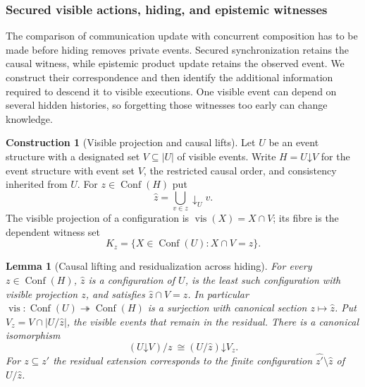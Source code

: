 \documentclass[11pt,a4paper]{article}
\numberwithin{equation}{section}
\newtheorem{lemma}[theorem]{Lemma}
\theoremstyle{definition}
\newtheorem{construction}[construction]{Construction}
\theoremstyle{remark}
\theoremstyle{plain}
\begin{document}
\subsubsection{Secured visible actions, hiding, and epistemic witnesses}
\label{sec:egt-secured-action-update}

The comparison of communication update with concurrent composition
has to be made before hiding removes private events. Secured
synchronization \citep{CastellanEtAl2017} retains the causal witness,
while epistemic product update
\citep{BaltagMossSolecki1998PublicAnnouncements} retains the
observed event. We construct their correspondence and then identify
the additional information required to descend it to visible
executions. One visible event can depend on several hidden histories,
so forgetting those witnesses too early can change knowledge.

\begin{construction}[Visible projection and causal lifts]
\label{con:egt-visible-causal-lift}
Let $U$ be an event structure with a designated set $V\subseteq|U|$ of
visible events. Write $H=U\mathord{\downarrow}V$ for the event structure
with event set $V$, the restricted causal order, and consistency inherited
from $U$. For $z\in\operatorname{Conf}(H)$ put
\begin{equation}\label{eq:egt-visible-causal-lift}
 \widehat z=\bigcup_{v\in z}\downarrow_Uv.
\end{equation}
The visible projection of a configuration is
$\operatorname{vis}(X)=X\cap V$; its fibre is the dependent witness set
\begin{equation}\label{eq:egt-hidden-history-witness}
 K_z=\{X\in\operatorname{Conf}(U):X\cap V=z\}.
\end{equation}
\end{construction}

\begin{lemma}[Causal lifting and residualization across hiding]
\label{lem:egt-hiding-residual}
For every $z\in\operatorname{Conf}(H)$, $\widehat z$ is a
configuration of $U$, is the least such configuration with visible
projection $z$, and satisfies $\widehat z\cap V=z$. In particular
$\operatorname{vis}:\operatorname{Conf}(U)\twoheadrightarrow
\operatorname{Conf}(H)$ is a surjection with canonical section
$z\mapsto\widehat z$.
Put $V_z=V\cap|U/\widehat z|$, the visible events that remain in
the residual. There is a canonical isomorphism
\begin{equation}\label{eq:egt-hiding-residual}
 (U\mathord{\downarrow}V)/z
 \ \cong
 (U/\widehat z)\mathord{\downarrow}V_z.
\end{equation}
For $z\subseteq z'$ the residual extension corresponds to the finite
configuration $\widehat{z'}\setminus\widehat z$ of $U/\widehat z$.
\end{lemma}
\end{document}
